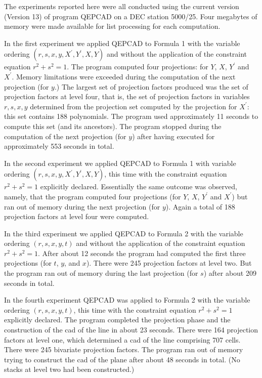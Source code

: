The experiments reported here were all conducted using
the current version (Version 13) of program QEPCAD on
a DEC station 5000/25. Four megabytes of memory
were made available for list processing for each computation.

In the first experiment we applied QEPCAD to
Formula 1 with the variable ordering
$(r,s,x,y,X^{\prime},Y^{\prime},X,Y)$ and without the application
of the constraint equation $r^{2} + s^{2} = 1$.
The program computed four projections: for
$Y$, $X$, $Y^{\prime}$ and $X^{\prime}$.
Memory limitations were exceeded during the computation of
the next projection (for $y$.)
The largest set of projection factors produced was the
set of projection factors at level four, that is, the
set of projection factors in variables $r, s, x, y$ determined from the
projection set computed by the projection for $X^{\prime}$:
this set contains 188 polynomials. 
The program used approximately 11 seconds
to compute this set (and its ancestors).
The program stopped during
the computation of the next projection (for $y$) after having executed for
approximately 553 seconds in total.

In the second experiment we applied QEPCAD to Formula 1 with
variable ordering $(r,s,x,y,X^{\prime},Y^{\prime},X,Y)$,
this time with the constraint equation 
$r^{2} + s^{2} = 1$ explicitly declared.
Essentially the same outcome was observed, namely, that the program
computed four projections (for $Y$, $X$, $Y^{\prime}$ and $X^{\prime}$)
but ran out of memory during the next projection (for $y$). Again a total
of 188 projection factors at level four were computed.

In the third experiment we applied QEPCAD to Formula 2
with the variable ordering $(r,s,x,y,t)$
and without the application of the constraint equation
$r^{2} + s^{2} = 1$.
After about 12 seconds the program had computed the
first three projections (for $t$, $y$, and $x$).
There were 245 projection factors at level two.
But the program ran out of memory during the last projection
(for $s$) after about 209 seconds in total.

In the fourth experiment QEPCAD was applied to Formula 2
with the variable ordering $(r,s,x,y,t)$,
this time with the constraint equation
$r^{2} + s^{2} = 1$ explicitly declared.
The program completed the projection phase and the construction
of the cad of the line in about 23 seconds.
There were 164 projection factors at level one,
which determined a cad of the line comprising 707 cells.
There were 245 bivariate projection factors.
The program ran out of memory trying to construct
the cad of the plane after about 48 seconds in total.
(No stacks at level two had been constructed.)

